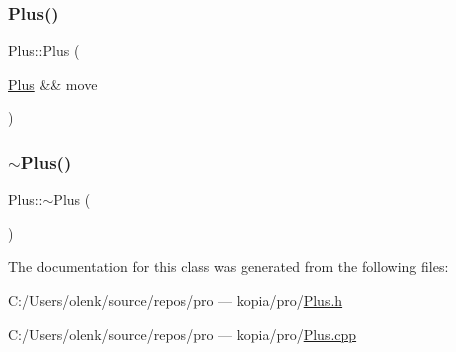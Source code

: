 \mbox{\label{class_plus_ad3b8464eb21864e4f8a29f5fab7f9656}} 
\subsubsection{\texorpdfstring{Plus()}{Plus()}\hspace{0.1cm}{\footnotesize\ttfamily [2/2]}}
{\footnotesize\ttfamily Plus\+::\+Plus (\begin{DoxyParamCaption}\item[{\mbox{\hyperlink{class_plus}{Plus}} \&\&}]{move }\end{DoxyParamCaption})}

\mbox{\label{class_plus_a8d2722ae57cd3ed3b8617c23499ac4c0}} 
\subsubsection{\texorpdfstring{$\sim$Plus()}{~Plus()}}
{\footnotesize\ttfamily Plus\+::$\sim$\+Plus (\begin{DoxyParamCaption}{ }\end{DoxyParamCaption})}



The documentation for this class was generated from the following files\+:\begin{DoxyCompactItemize}
\item 
C\+:/\+Users/olenk/source/repos/pro — kopia/pro/\mbox{\hyperlink{_plus_8h}{Plus.\+h}}\item 
C\+:/\+Users/olenk/source/repos/pro — kopia/pro/\mbox{\hyperlink{_plus_8cpp}{Plus.\+cpp}}\end{DoxyCompactItemize}
